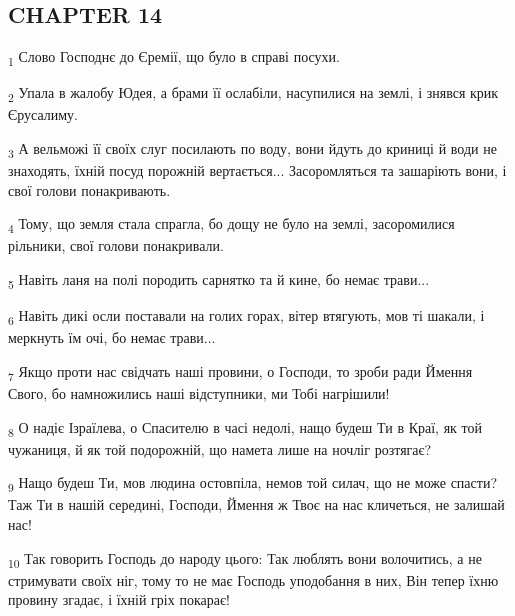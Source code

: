 \subsection{CHAPTER 14}
\begin{tcolorbox}
\textsubscript{1} Слово Господнє до Єремії, що було в справі посухи.
\end{tcolorbox}
\begin{tcolorbox}
\textsubscript{2} Упала в жалобу Юдея, а брами її ослабіли, насупилися на землі, і знявся крик Єрусалиму.
\end{tcolorbox}
\begin{tcolorbox}
\textsubscript{3} А вельможі її своїх слуг посилають по воду, вони йдуть до криниці й води не знаходять, їхній посуд порожній вертається... Засоромляться та зашаріють вони, і свої голови понакривають.
\end{tcolorbox}
\begin{tcolorbox}
\textsubscript{4} Тому, що земля стала спрагла, бо дощу не було на землі, засоромилися рільники, свої голови понакривали.
\end{tcolorbox}
\begin{tcolorbox}
\textsubscript{5} Навіть ланя на полі породить сарнятко та й кине, бо немає трави...
\end{tcolorbox}
\begin{tcolorbox}
\textsubscript{6} Навіть дикі осли поставали на голих горах, вітер втягують, мов ті шакали, і меркнуть їм очі, бо немає трави...
\end{tcolorbox}
\begin{tcolorbox}
\textsubscript{7} Якщо проти нас свідчать наші провини, о Господи, то зроби ради Ймення Свого, бо намножились наші відступники, ми Тобі нагрішили!
\end{tcolorbox}
\begin{tcolorbox}
\textsubscript{8} О надіє Ізраїлева, о Спасителю в часі недолі, нащо будеш Ти в Краї, як той чужаниця, й як той подорожній, що намета лише на ночліг розтягає?
\end{tcolorbox}
\begin{tcolorbox}
\textsubscript{9} Нащо будеш Ти, мов людина остовпіла, немов той силач, що не може спасти? Таж Ти в нашій середині, Господи, Ймення ж Твоє на нас кличеться, не залишай нас!
\end{tcolorbox}
\begin{tcolorbox}
\textsubscript{10} Так говорить Господь до народу цього: Так люблять вони волочитись, а не стримувати своїх ніг, тому то не має Господь уподобання в них, Він тепер їхню провину згадає, і їхній гріх покарає!
\end{tcolorbox}
